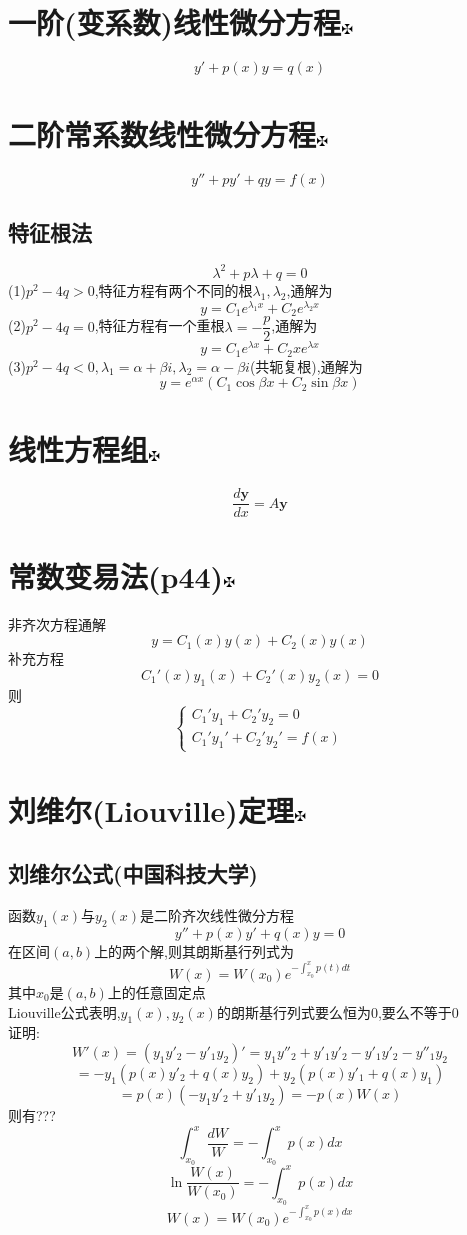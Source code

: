 \documentclass[11pt, a4paper, UTF8]{ctexart}
\begin{document}
\section{一阶(变系数)线性微分方程\protect\hyperlink{catalog}{$\fuck$}}
$$y'+p(x)y=q(x)$$
\section{二阶常系数线性微分方程\protect\hyperlink{catalog}{$\fuck$}}
$$y''+py'+qy=f(x)$$
\subsection{特征根法}
$$\lambda^2+p\lambda+q=0$$
(1)$p^2-4q>0$,特征方程有两个不同的根$\lambda_1,\lambda_2$,通解为\\
$$y=C_1e^{\lambda_1x}+C_2e^{\lambda_2x}$$
(2)$p^2-4q=0$,特征方程有一个重根$\lambda=-\dfrac{p}{2}$,通解为\\
$$y=C_1e^{\lambda x}+C_2xe^{\lambda x}$$
(3)$p^2-4q<0,\lambda_1=\alpha+\beta i,\lambda_2=\alpha-\beta i$(共轭复根),通解为\\
$$y=e^{\alpha x}(C_1\cos\beta x+C_2\sin\beta x)$$
\section{线性方程组\protect\hyperlink{catalog}{$\fuck$}}
$$\dfrac{d\bm{y}}{dx}=A\bm{y}$$
\section{常数变易法(p44)\protect\hyperlink{catalog}{$\fuck$}}
非齐次方程通解\\
$$y=C_1(x)y(x)+C_2(x)y(x)$$
补充方程\\
$$C_1'(x)y_1(x)+C_2'(x)y_2(x)=0$$
则\\
$$
\begin{cases}
C_1'y_1+C_2'y_2=0\\
C_1'y_1'+C_2'y_2'=f(x)
\end{cases}
$$
\section{刘维尔(Liouville)定理\protect\hyperlink{catalog}{$\fuck$}}
\subsection{刘维尔公式(中国科技大学)}
函数$y_1(x)$与$y_2(x)$是二阶齐次线性微分方程\\
\[y''+p(x)y'+q(x)y=0\]
在区间$(a,b)$上的两个解,则其朗斯基行列式为\\
\[W(x)=W(x_0)e^{-\int_{x_0}^xp(t)dt}\]
其中$x_0$是$(a,b)$上的任意固定点\\
Liouville公式表明,$y_1(x),y_2(x)$的朗斯基行列式要么恒为$0$,要么不等于$0$\\
证明:\\
\[W'(x)=(y_1y'_2-y'_1y_2)'=y_1y''_2+y'_1y'_2-y'_1y'_2-y''_1y_2\]
\[=-y_1(p(x)y'_2+q(x)y_2)+y_2(p(x)y'_1+q(x)y_1)\]
\[=p(x)(-y_1y'_2+y'_1y_2)=-p(x)W(x)\]
则有???\\
\[\int_{x_0}^x\dfrac{dW}{W}=-\int_{x_0}^xp(x)dx\]
\[\ln\dfrac{W(x)}{W(x_0)}=-\int_{x_0}^xp(x)dx\]
\[W(x)=W(x_0)e^{-\int_{x_0}^xp(x)dx}\]
\end{document}
